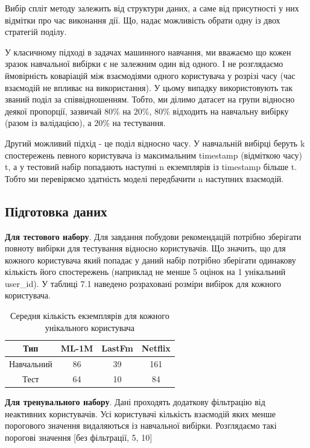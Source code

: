 Вибір спліт методу залежить від структури даних, а саме від присутності у них відмітки про час виконання дії. Що, надає можливість обрати одну із двох стратегій поділу.

У класичному підході в задачах машинного навчання, ми вважаємо що кожен зразок навчальної вибірки є не залежним один від одного. І не розглядаємо ймовірність коваріацій між взаємодіями одного користувача у розрізі часу (час взаємодій не впливає на використання). У цьому випадку використовують так званий поділ за співвідношенням. Тобто, ми ділимо датасет на групи відносно деякої пропорції, зазвичай $80\%$ на $20\%$, $80\%$ відходить на навчальну вибірку (разом із валідацією), а $20\%$ на тестування.

Другий можливий підхід - це поділ відносно часу. У навчальній вибірці беруть k спостережень певного користувача із максимальним timestamp (відміткою часу) t, а у тестовий набір попадають наступні n екземплярів із  timestamp більше t.
Тобто ми перевіряємо здатність моделі передбачити n наступних взаємодій.
\subsection{Підготовка даних}

\textbf{Для тестового набору}. Для завдання побудови рекомендацій потрібно зберігати повноту вибірки для тестування відносно користувачів. Що значить, що для кожного користувача який попадає у даний набір потрібно зберігати одинакову кількість його спостережень (наприклад не менше 5 оцінок на 1 унікальний user\_id).
У таблиці 7.1 наведено розраховані розміри вибірок для кожного користувача.
\begin{table}[]
    \centering
    \caption{Середня кількість екземплярів для кожного унікального користувача}
    \begin{tabular}{|c|c|c|c|}
        \hline
        Тип        & ML-1M & LastFm & Netflix \\ \hline
        Навчальний & 86    & 39     & 161     \\ \hline
        Тест       & 64    & 10     & 84      \\ \hline
    \end{tabular}
    \label{tab:size_of_split}
\end{table}

\textbf{Для тренувального набору}. Дані проходять додаткову фільтрацію від неактивних користувачів. Усі користувачі кількість взаємодій яких менше порогового значення видаляються із навчальної вибірки. Розглядаємо такі порогові значення [без фільтрації, 5, 10] 


